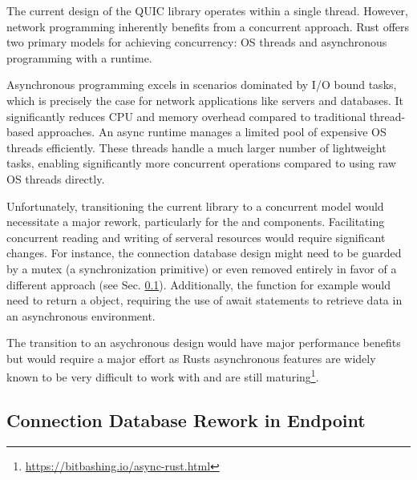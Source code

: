 The current design of the QUIC library operates within a single thread. However, network programming inherently benefits from a
concurrent approach. Rust offers two primary models for achieving concurrency: OS threads and asynchronous programming with a runtime.

Asynchronous programming excels in scenarios dominated by I/O bound tasks, which is precisely the case for network applications
like servers and databases. It significantly reduces CPU and memory overhead compared to traditional thread-based approaches.
An async runtime manages a limited pool of expensive OS threads efficiently. These threads handle a much larger
number of lightweight tasks, enabling significantly more concurrent operations compared to using raw OS threads directly.

Unfortunately, transitioning the current library to a concurrent model would necessitate a major rework, particularly for the
 and  components. Facilitating concurrent reading and writing of serveral resources 
would require significant changes. For instance, the connection database design might need to be guarded by a mutex (a synchronization
primitive) or even removed entirely in favor of a different approach (see Sec. \ref{connection_db_rework}). Additionally, the
 function for example would need to return a  object, requiring the use of await
statements to retrieve data in an asynchronous environment.

The transition to an asychronous design would have major performance benefits but would require a major effort as Rusts asynchronous
features are widely known to be very difficult to work with and are still maturing\footnote{\url{https://bitbashing.io/async-rust.html}}.

\subsection{Connection Database Rework in Endpoint} \label{connection_db_rework}


